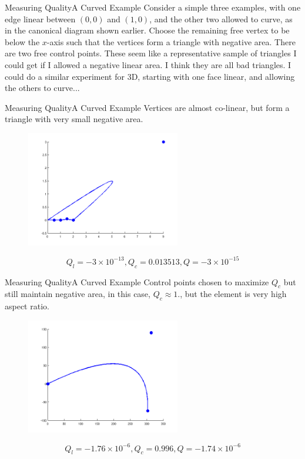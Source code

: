 \documentclass[12pt]{beamer}
\newcommand{\spa}{\vspace{0.5cm}\newline}
\begin{document}
\begin{frame}{Measuring Quality}{A Curved Example}
Consider a simple three examples, with one edge linear between $(0,0)$ and $(1,0)$, and the other two allowed to curve, as in the canonical diagram shown earlier. \spa
Choose the remaining free vertex to be below the $x$-axis such that the vertices form a triangle with negative area. There are two free control points. \spa
These seem like a representative sample of triangles I could get if I allowed a negative linear area. I think they are all bad triangles. I could do a similar experiment for 3D, starting with one face linear, and allowing the others to curve...
\end{frame}
\begin{frame}{Measuring Quality}{A Curved Example}
Vertices are almost co-linear, but form a triangle with very small negative area.
\begin{figure}
  \centering
  \includegraphics[width=0.60\textwidth]{bezier_images/curved1.png} 
\end{figure}
\[Q_l = -3\times 10^{-13}, Q_c = 0.013513, Q = -3\times10^{-15}\]
\end{frame}
\begin{frame}{Measuring Quality}{A Curved Example}
Control points chosen to maximize $Q_c$ but still maintain negative area, in this case, $Q_c \approx 1.$, but the element is very high aspect ratio.
\begin{figure}
  \centering
  \includegraphics[width=0.60\textwidth]{bezier_images/curved2.png} 
\end{figure}
\[Q_l = -1.76\times10^{-6}, Q_c = 0.996, Q = -1.74\times10^{-6}\]
\end{frame}
\end{document}
